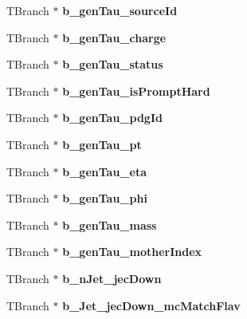 \begin{DoxyCompactItemize}
T\+Branch $\ast$ {\bfseries b\+\_\+gen\+Tau\+\_\+source\+Id}
\item 
\hypertarget{classMiniTree_ac00fe8e3a30b68dd6ad5506cc65a77c4}{}\label{classMiniTree_ac00fe8e3a30b68dd6ad5506cc65a77c4} 
T\+Branch $\ast$ {\bfseries b\+\_\+gen\+Tau\+\_\+charge}
\item 
\hypertarget{classMiniTree_a046962095b2b9b2b96c20ef2a898244a}{}\label{classMiniTree_a046962095b2b9b2b96c20ef2a898244a} 
T\+Branch $\ast$ {\bfseries b\+\_\+gen\+Tau\+\_\+status}
\item 
\hypertarget{classMiniTree_a37db851f5b052f73efcf7f714d7494af}{}\label{classMiniTree_a37db851f5b052f73efcf7f714d7494af} 
T\+Branch $\ast$ {\bfseries b\+\_\+gen\+Tau\+\_\+is\+Prompt\+Hard}
\item 
\hypertarget{classMiniTree_aff11f0cf64b1f1808a68a5c140e276ee}{}\label{classMiniTree_aff11f0cf64b1f1808a68a5c140e276ee} 
T\+Branch $\ast$ {\bfseries b\+\_\+gen\+Tau\+\_\+pdg\+Id}
\item 
\hypertarget{classMiniTree_a1fa1e16e09d34e7e8eaa3939cbd26392}{}\label{classMiniTree_a1fa1e16e09d34e7e8eaa3939cbd26392} 
T\+Branch $\ast$ {\bfseries b\+\_\+gen\+Tau\+\_\+pt}
\item 
\hypertarget{classMiniTree_a4c86e8317490fd37bfcf04fca798bc54}{}\label{classMiniTree_a4c86e8317490fd37bfcf04fca798bc54} 
T\+Branch $\ast$ {\bfseries b\+\_\+gen\+Tau\+\_\+eta}
\item 
\hypertarget{classMiniTree_ab30166b4ee65621f2dea35850a86d7e2}{}\label{classMiniTree_ab30166b4ee65621f2dea35850a86d7e2} 
T\+Branch $\ast$ {\bfseries b\+\_\+gen\+Tau\+\_\+phi}
\item 
\hypertarget{classMiniTree_adb44df98d96ea5a85403b7b93d8f0fb6}{}\label{classMiniTree_adb44df98d96ea5a85403b7b93d8f0fb6} 
T\+Branch $\ast$ {\bfseries b\+\_\+gen\+Tau\+\_\+mass}
\item 
\hypertarget{classMiniTree_a7e8a282602cb606015a9e9eb174ae27a}{}\label{classMiniTree_a7e8a282602cb606015a9e9eb174ae27a} 
T\+Branch $\ast$ {\bfseries b\+\_\+gen\+Tau\+\_\+mother\+Index}
\item 
\hypertarget{classMiniTree_a42d54e9b1dc7ded0499e76b7c569dc40}{}\label{classMiniTree_a42d54e9b1dc7ded0499e76b7c569dc40} 
T\+Branch $\ast$ {\bfseries b\+\_\+n\+Jet\+\_\+jec\+Down}
\item 
\hypertarget{classMiniTree_af1997affb3640595ec799947795ad16a}{}\label{classMiniTree_af1997affb3640595ec799947795ad16a} 
T\+Branch $\ast$ {\bfseries b\+\_\+\+Jet\+\_\+jec\+Down\+\_\+mc\+Match\+Flav}
\item 

\end{DoxyCompactItemize}
